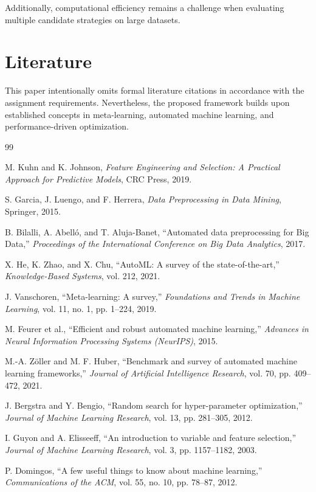 \documentclass[11pt,a4paper]{article}
\begin{document}
Additionally, computational efficiency remains a challenge when evaluating multiple candidate strategies on large datasets.

\section{Literature}

This paper intentionally omits formal literature citations in accordance with the assignment requirements. Nevertheless, the proposed framework builds upon established concepts in meta-learning, automated machine learning, and performance-driven optimization.


\begin{thebibliography}{99}

M. Kuhn and K. Johnson,
\textit{Feature Engineering and Selection: A Practical Approach for Predictive Models},
CRC Press, 2019.

S. Garcia, J. Luengo, and F. Herrera,
\textit{Data Preprocessing in Data Mining},
Springer, 2015.

B. Bilalli, A. Abelló, and T. Aluja-Banet,
``Automated data preprocessing for Big Data,''
\textit{Proceedings of the International Conference on Big Data Analytics}, 2017.

X. He, K. Zhao, and X. Chu,
``AutoML: A survey of the state-of-the-art,''
\textit{Knowledge-Based Systems}, vol. 212, 2021.

J. Vanschoren,
``Meta-learning: A survey,''
\textit{Foundations and Trends in Machine Learning},
vol. 11, no. 1, pp. 1--224, 2019.

M. Feurer et al.,
``Efficient and robust automated machine learning,''
\textit{Advances in Neural Information Processing Systems (NeurIPS)}, 2015.

M.-A. Zöller and M. F. Huber,
``Benchmark and survey of automated machine learning frameworks,''
\textit{Journal of Artificial Intelligence Research}, vol. 70, pp. 409--472, 2021.

J. Bergstra and Y. Bengio,
``Random search for hyper-parameter optimization,''
\textit{Journal of Machine Learning Research}, vol. 13, pp. 281--305, 2012.

I. Guyon and A. Elisseeff,
``An introduction to variable and feature selection,''
\textit{Journal of Machine Learning Research}, vol. 3, pp. 1157--1182, 2003.

P. Domingos,
``A few useful things to know about machine learning,''
\textit{Communications of the ACM}, vol. 55, no. 10, pp. 78--87, 2012.

\end{thebibliography}
\end{document}
